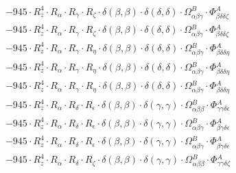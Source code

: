 \documentclass{article}
\begin{document}
\begin{subequations}
\begin{gather}
\begin{array}{c}
 \\[0.2em] 		 - 945 \cdot R_{z}^{4} \cdot R_{\alpha{}} \cdot R_{\gamma{}} \cdot R_{\zeta{}} \cdot \delta{}\left(\beta{}, \beta{}\right) \cdot \delta{}\left(\delta{}, \delta{}\right) \cdot \Omega{}^{B}_{\alpha{}\beta{}\gamma{}} \cdot \Phi{}^{A}_{\beta{}\delta{}\delta{}\zeta{}} 
 \\[0.2em] 		 - 945 \cdot R_{z}^{4} \cdot R_{\alpha{}} \cdot R_{\gamma{}} \cdot R_{\zeta{}} \cdot \delta{}\left(\beta{}, \beta{}\right) \cdot \delta{}\left(\delta{}, \delta{}\right) \cdot \Omega{}^{B}_{\alpha{}\beta{}\gamma{}} \cdot \Phi{}^{A}_{\beta{}\delta{}\delta{}\zeta{}} 
 \\[0.2em] 		 - 945 \cdot R_{z}^{4} \cdot R_{\alpha{}} \cdot R_{\gamma{}} \cdot R_{\eta{}} \cdot \delta{}\left(\beta{}, \beta{}\right) \cdot \delta{}\left(\delta{}, \delta{}\right) \cdot \Omega{}^{B}_{\alpha{}\beta{}\gamma{}} \cdot \Phi{}^{A}_{\beta{}\delta{}\delta{}\eta{}} 
 \\[0.2em] 		 - 945 \cdot R_{z}^{4} \cdot R_{\alpha{}} \cdot R_{\gamma{}} \cdot R_{\eta{}} \cdot \delta{}\left(\beta{}, \beta{}\right) \cdot \delta{}\left(\delta{}, \delta{}\right) \cdot \Omega{}^{B}_{\alpha{}\beta{}\gamma{}} \cdot \Phi{}^{A}_{\beta{}\delta{}\delta{}\eta{}} 
 \\[0.2em] 		 - 945 \cdot R_{z}^{4} \cdot R_{\alpha{}} \cdot R_{\gamma{}} \cdot R_{\eta{}} \cdot \delta{}\left(\beta{}, \beta{}\right) \cdot \delta{}\left(\delta{}, \delta{}\right) \cdot \Omega{}^{B}_{\alpha{}\beta{}\gamma{}} \cdot \Phi{}^{A}_{\beta{}\delta{}\delta{}\eta{}} 
 \\[0.2em] 		 - 945 \cdot R_{z}^{4} \cdot R_{\alpha{}} \cdot R_{\delta{}} \cdot R_{\epsilon{}} \cdot \delta{}\left(\beta{}, \beta{}\right) \cdot \delta{}\left(\gamma{}, \gamma{}\right) \cdot \Omega{}^{B}_{\alpha{}\beta{}\beta{}} \cdot \Phi{}^{A}_{\gamma{}\gamma{}\delta{}\epsilon{}} 
 \\[0.2em] 		 - 945 \cdot R_{z}^{4} \cdot R_{\alpha{}} \cdot R_{\delta{}} \cdot R_{\epsilon{}} \cdot \delta{}\left(\beta{}, \beta{}\right) \cdot \delta{}\left(\gamma{}, \gamma{}\right) \cdot \Omega{}^{B}_{\alpha{}\beta{}\gamma{}} \cdot \Phi{}^{A}_{\beta{}\gamma{}\delta{}\epsilon{}} 
 \\[0.2em] 		 - 945 \cdot R_{z}^{4} \cdot R_{\alpha{}} \cdot R_{\delta{}} \cdot R_{\epsilon{}} \cdot \delta{}\left(\beta{}, \beta{}\right) \cdot \delta{}\left(\gamma{}, \gamma{}\right) \cdot \Omega{}^{B}_{\alpha{}\beta{}\gamma{}} \cdot \Phi{}^{A}_{\beta{}\gamma{}\delta{}\epsilon{}} 
 \\[0.2em] 		 - 945 \cdot R_{z}^{4} \cdot R_{\alpha{}} \cdot R_{\delta{}} \cdot R_{\zeta{}} \cdot \delta{}\left(\beta{}, \beta{}\right) \cdot \delta{}\left(\gamma{}, \gamma{}\right) \cdot \Omega{}^{B}_{\alpha{}\beta{}\beta{}} \cdot \Phi{}^{A}_{\gamma{}\gamma{}\delta{}\zeta{}} 

\end{array}
\end{gather}
\end{subequations}
\end{document}
